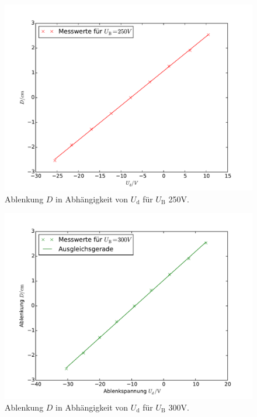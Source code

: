 \begin{figure}
  \centering
  \includegraphics[scale=0.8]{auswertung/501-a-2.pdf}
\caption{Ablenkung $D$ in Abhängigkeit von $U_\mathrm{d}$ für $U_\mathrm{B}$ 250\si{\volt}.}
  \label{fig:empfindlichkeit2}
\end{figure}

\begin{figure}
  \centering
  \includegraphics[scale=0.8]{auswertung/501-a-3.pdf}
\caption{Ablenkung $D$ in Abhängigkeit von $U_\mathrm{d}$ für $U_\mathrm{B}$ 300\si{\volt}.}
  \label{fig:empfindlichkeit3}
\end{figure}

